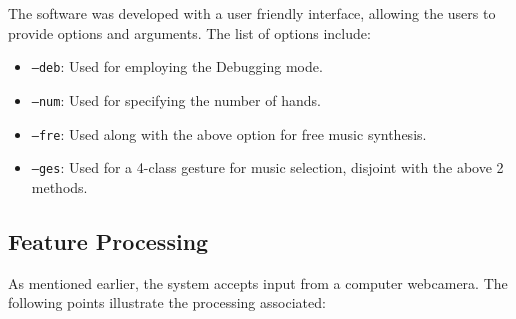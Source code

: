 \documentclass[letterpaper, 11 pt, twoside, conference]{ieeeconf}
\begin{document}
The software was developed with a user friendly interface, allowing the users to provide
options and arguments. The list of options include:
\begin{itemize}
  \item \texttt{--deb}: Used for employing the Debugging mode.
  \item \texttt{--num}: Used for specifying the number of hands.
  \item \texttt{--fre}: Used along with the above option for free music synthesis.
  \item \texttt{--ges}: Used for a 4-class gesture for music selection, disjoint with the
    above 2 methods.
\end{itemize}

\subsection{Feature Processing}
  As mentioned earlier, the system accepts input from a computer webcamera. The following points illustrate
  the processing associated:
\end{document}
